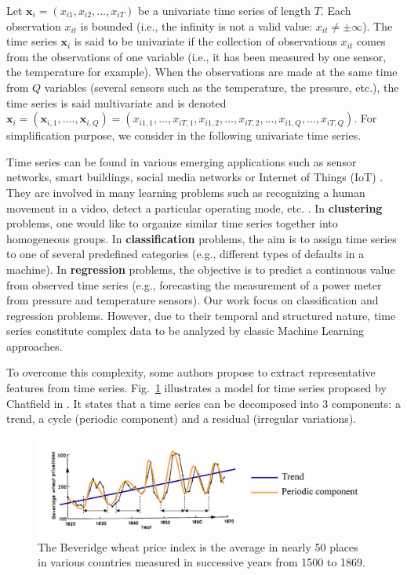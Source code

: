 Let $\textbf{x}_i=(x_{i1}, x_{i2}, ..., x_{iT})$ be a univariate time series of length $T$. Each observation $x_{it}$ is bounded (i.e., the infinity is not a valid value: $x_{it} \neq \pm \infty$). The time series $\textbf{x}_i$ is said to be univariate if the collection of observations $x_{it}$ comes from the observations of one variable (i.e., it has been measured by one sensor, the temperature for example). When the observations are made at the same time from $Q$ variables (several sensors such as the temperature, the pressure, etc.), the time series is said multivariate and is denoted $\textbf{x}_i=(\textbf{x}_{i,1}, ...., \textbf{x}_{i,Q})=(x_{i1,1}, ..., x_{iT,1},x_{i1,2}, ..., x_{iT,2}, ..., x_{i1,Q}, ..., x_{iT,Q})$. For simplification purpose, we consider in the following univariate time series. 

Time series can be found in various emerging applications such as sensor networks, smart buildings, social media networks or Internet of Things (IoT) \cite{Najmeddine2012,Nguyen2012,Yin2008}. They are involved in many learning problems such as recognizing a human movement in a video, detect a particular operating mode, etc. . In \textbf{clustering} problems, one would like to organize similar time series together into homogeneous groups. In \textbf{classification} problems, the aim is to assign time series to one of several predefined categories (e.g., different types of defaults in a machine). In \textbf{regression} problems, the objective is to predict a continuous value from observed time series (e.g., forecasting the measurement of a power meter from pressure and temperature sensors). Our work focus on classification and regression problems. However, due to their temporal and structured nature, time series constitute complex data to be analyzed by classic Machine Learning approaches.

To overcome this complexity, some authors propose to extract representative features from time series. Fig.~\ref{fig:time_series_example} illustrates a model for time series proposed by Chatfield in \cite{Chatfield2004}. It states that a time series can be decomposed into 3 components: a trend, a cycle (periodic component) and a residual (irregular variations). 

\begin{figure}[h!]
\centering
\includegraphics[width=0.9\linewidth]{images/time_series_example}
\caption{The Beveridge wheat price index is the average in nearly 50 places in various countries measured in successive years from 1500 to 1869. \protect\footnotemark}
\label{fig:time_series_example}
\end{figure}

